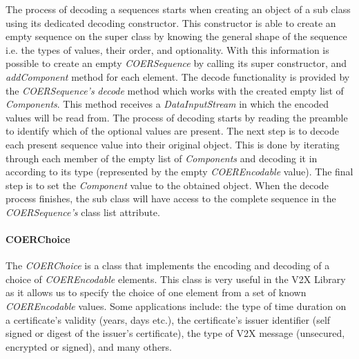 The process of decoding a sequences starts when creating an object of a sub class using its dedicated decoding constructor. This constructor is able to create an empty sequence on the super class by knowing the general shape of the sequence i.e. the types of values, their order, and optionality. With this information is possible to create an empty \textit{COERSequence} by calling its super constructor, and \textit{addComponent} method for each element. The decode functionality is provided by the \textit{COERSequence's} \textit{decode} method which works with the created empty list of \textit{Components}. This method receives a \textit{DataInputStream} in which the encoded values will be read from. The process of decoding starts by reading the preamble to identify which of the optional values are present. The next step is to decode each present sequence value into their original object. This is done by iterating through each member of the empty list of \textit{Components} and decoding it in according to its type (represented by the empty \textit{COEREncodable} value). The final step is to set the \textit{Component} value to the obtained object. When the decode process finishes, the sub class will have access to the complete sequence in the \textit{COERSequence's} class list attribute.

\paragraph{COERChoice}
The \textit{COERChoice} is a class that implements the encoding and decoding of a choice of \textit{COEREncodable} elements. This class is very useful in the V2X Library as it allows us to specify the choice of one element from a set of known \textit{COEREncodable} values. Some applications include: the type of time duration on a certificate's validity (years, days etc.), the certificate's issuer identifier (self signed or digest of the issuer's certificate), the type of V2X message (unsecured, encrypted or signed), and many others. 

